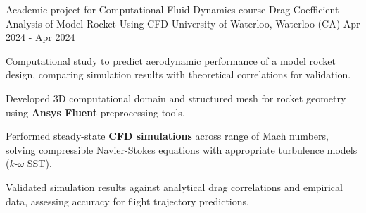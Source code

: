 
\cventry
{Academic project for Computational Fluid Dynamics course}
{Drag Coefficient Analysis of Model Rocket Using CFD}
{University of Waterloo, Waterloo (CA)}
{Apr 2024 - Apr 2024}
{
    Computational study to predict aerodynamic performance of a model rocket design, comparing simulation results with theoretical correlations for validation.
    \newline
    \vspace{4mm}
    \begin{cvitems}
        \item {Developed 3D computational domain and structured mesh for rocket geometry using \textbf{Ansys Fluent} preprocessing tools.}
        \item {Performed steady-state \textbf{CFD simulations} across range of Mach numbers, solving compressible Navier-Stokes equations with appropriate turbulence models ($k$-$\omega$ SST).}
        \item {Validated simulation results against analytical drag correlations and empirical data, assessing accuracy for flight trajectory predictions.}
    \end{cvitems}
}
